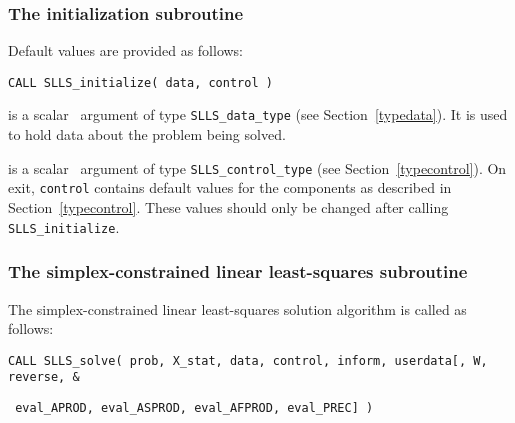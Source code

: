 \documentclass{galahad}
\newcommand{\packagename}{SLLS}
\begin{document}

\subsubsection{The initialization subroutine}\label{subinit}
 Default values are provided as follows:
\vspace*{1mm}

\hspace{8mm}
{\tt CALL \packagename\_initialize( data, control )}

\vspace*{-3mm}
\begin{description}

 is a scalar \intentinout\ argument of type
{\tt \packagename\_data\_type}
(see Section~\ref{typedata}). It is used to hold data about the problem being
solved.

 is a scalar \intentout\ argument of type
{\tt \packagename\_control\_type}
(see Section~\ref{typecontrol}).
On exit, {\tt control} contains default values for the components as
described in Section~\ref{typecontrol}.
These values should only be changed after calling
{\tt \packagename\_initialize}.

\end{description}


\subsubsection{The simplex-constrained linear least-squares subroutine}\label{qps}
The simplex-constrained linear least-squares solution algorithm is called
as follows:
\vspace*{1mm}

\hspace{8mm}
{\tt CALL \packagename\_solve( prob, X\_stat, data, control, inform, userdata[,
W, reverse, %
\&}
\vspace*{-1mm}

\hspace{37mm}
{\tt
eval\_APROD, eval\_ASPROD, eval\_AFPROD, eval\_PREC] )}
\end{document}
